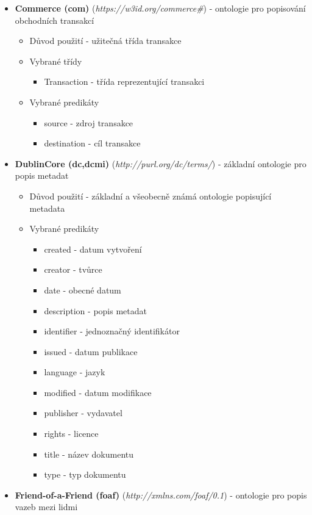\begin{itemize}
\item \textbf{Commerce (com)} (\textit{https://w3id.org/commerce\#}) - ontologie pro popisování obchodních transakcí
	\begin{itemize}
	\item Důvod použití - užitečná třída transakce 
	\item Vybrané třídy 
		\begin{itemize}
		\item Transaction - třída reprezentující transakci 
		\end{itemize}
	\item Vybrané predikáty
		\begin{itemize}
		\item source - zdroj transakce
		\item destination - cíl transakce
		\end{itemize}
	\end{itemize}
\item \textbf{DublinCore (dc,dcmi)} (\textit{http://purl.org/dc/terms/}) - základní ontologie pro popis metadat 
	\begin{itemize}
	\item Důvod použití - základní a všeobecně známá ontologie popisující metadata
	\item Vybrané predikáty
		\begin{itemize}
		\item created - datum vytvoření
		\item creator - tvůrce
		\item date - obecné datum
		\item description - popis metadat
		\item identifier - jednoznačný identifikátor
		\item issued - datum publikace
		\item language - jazyk
		\item modified - datum modifikace
		\item publisher - vydavatel
		\item rights - licence
		\item title - název dokumentu
		\item type - typ dokumentu
		\end{itemize}
	\end{itemize}
\item \textbf{Friend-of-a-Friend (foaf)} (\textit{http://xmlns.com/foaf/0.1}) - ontologie pro popis vazeb mezi lidmi
	\begin{itemize}

\end{itemize}
\end{itemize}
